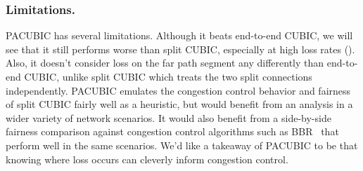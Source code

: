 \subsubsection{Limitations.}

PACUBIC has several limitations. Although it beats end-to-end CUBIC, we will see
that it still performs worse than split CUBIC, especially at high loss rates
(). Also, it doesn't consider loss on the far
path segment any differently than end-to-end CUBIC, unlike split CUBIC which
treats the two split connections independently. PACUBIC emulates the congestion
control behavior and fairness of split CUBIC fairly well as a heuristic, but
would benefit from an analysis in a wider variety of network scenarios. It
would also benefit from a side-by-side fairness comparison against congestion
control algorithms such as BBR~\cite{cardwell2024bbr-ietf-draft} that perform
well in the same scenarios. We'd like a takeaway of PACUBIC to be that knowing
where loss occurs can cleverly inform congestion control.
